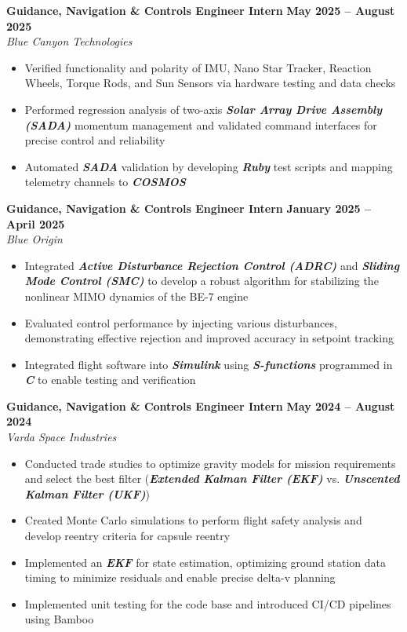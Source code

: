 \documentclass[10pt]{article}
\begin{document}
	\textbf{Guidance, Navigation \& Controls Engineer Intern} \hfill \textbf{May 2025 – August 2025} \\
	\emph{Blue Canyon Technologies}
	\begin{itemize}
		\item Verified functionality and polarity of IMU, Nano Star Tracker, Reaction Wheels, Torque Rods, and Sun Sensors via hardware testing and data checks
		\item Performed regression analysis of two-axis \textbf{\emph{Solar Array Drive Assembly (SADA)}} momentum management and validated command interfaces for precise control and reliability
		\item Automated \textbf{\emph{SADA}} validation by developing \textbf{\emph{Ruby}} test scripts and mapping telemetry channels to \textbf{\emph{COSMOS}}
	\end{itemize}

	\textbf{Guidance, Navigation \& Controls Engineer Intern} \hfill \textbf{January 2025 – April 2025} \\
	\emph{Blue Origin}
	\begin{itemize}
	    \item Integrated \textbf{\emph{Active Disturbance Rejection Control (ADRC)}} and \textbf{\emph{Sliding Mode Control (SMC)}} to develop a robust algorithm for stabilizing the nonlinear MIMO dynamics of the BE-7 engine
	    \item Evaluated control performance by injecting various disturbances, demonstrating effective rejection and improved accuracy in setpoint tracking
	   \item Integrated flight software into \textbf{\emph{Simulink}} using \textbf{\emph{S-functions}} programmed in \textbf{\emph{C}} to enable testing and verification
	\end{itemize}

	\textbf{Guidance, Navigation \& Controls Engineer Intern} \hfill \textbf{May 2024 – August 2024} \\
	\emph{Varda Space Industries}
	\begin{itemize}
	    \item Conducted trade studies to optimize gravity models for mission requirements and select the best filter (\textbf{\emph{Extended Kalman Filter (EKF)}} vs. \textbf{\emph{Unscented Kalman Filter (UKF)}})
	    \item Created Monte Carlo simulations to perform flight safety analysis and develop reentry criteria for capsule reentry
	    \item Implemented an \textbf{\emph{EKF}} for state estimation, optimizing ground station data timing to minimize residuals and enable precise delta-v planning
	    \item Implemented unit testing for the code base and introduced CI/CD pipelines using Bamboo
	\end{itemize}
\end{document}
